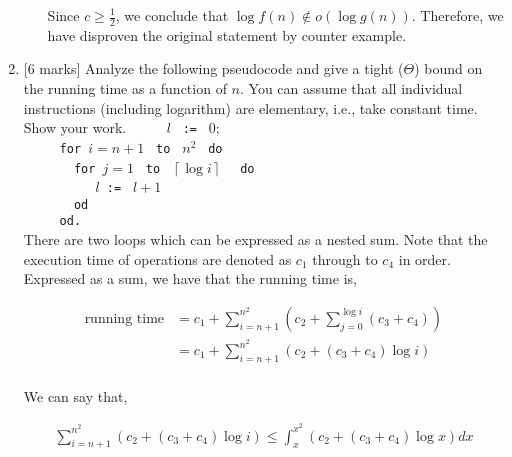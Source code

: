 \begin{enumerate}
\begin{enumerate}
                    Since $c \ge \frac{1}{2}$, we conclude that $\log{f \left( n \right)} \notin o\left( \log{g \left( n \right)} \right)$.
                    Therefore, we have disproven the original statement by counter example.










          \end{enumerate}
    \item {[6 marks]} Analyze the following pseudocode and give a tight ($\Theta$) bound on the running time
          as a function of $n$. You can assume that all individual instructions
          (including logarithm) are elementary, i.e., take constant time. Show your work.
          \verb|     |$l$ \verb| := | 0;\\
          \verb|     for |$i=n+1$ \verb| to | $ n^2 $ \verb| do |\\
          \verb|       for |$j=1$ \verb| to | $\left\lceil \log{i} \right\rceil$ \verb|  do |\\
          \verb|          |$l $\verb| := | $l+1$\\
          \verb|       od  |\\
          \verb|     od.|\\

          There are two loops which can be expressed as a nested sum. Note that the execution time of operations
          are denoted as $c_1$ through to $c_4$ in order. Expressed as a sum, we have that the running time is,

          \begin{align*}
              \text{running time} & = c_1 + \sum_{i=n+1}^{n^2} \left( c_2 + \sum_{j=0}^{\log{i}} \left( c_3 + c_4 \right) \right) \\
                                  & = c_1 + \sum_{i=n+1}^{n^2} \left( c_2 + \left( c_3 + c_4 \right) \log{i} \right)              \\
          \end{align*}

          We can say that,

          \begin{align*}
              \sum_{i=n+1}^{n^2} \left( c_2 + \left( c_3 + c_4 \right) \log{i} \right) \le \int_{x}^{x^2} \left( c_2 + \left( c_3 + c_4 \right) \log{x} \right) dx
          \end{align*}


\end{enumerate}
